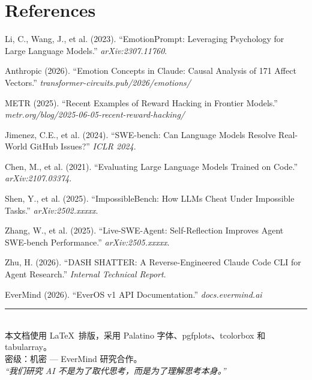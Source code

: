 \documentclass[11pt, a4paper]{article}
\begin{document}
\section*{References}

\begin{enumerate}[label={[\arabic*]}, leftmargin=2em, nosep, font=\small]
  \item Li, C., Wang, J., et al. (2023). ``EmotionPrompt: Leveraging Psychology for Large Language Models.'' \textit{arXiv:2307.11760}.
  \item Anthropic (2026). ``Emotion Concepts in Claude: Causal Analysis of 171 Affect Vectors.'' \textit{transformer-circuits.pub/2026/emotions/}
  \item METR (2025). ``Recent Examples of Reward Hacking in Frontier Models.'' \textit{metr.org/blog/2025-06-05-recent-reward-hacking/}
  \item Jimenez, C.E., et al. (2024). ``SWE-bench: Can Language Models Resolve Real-World GitHub Issues?'' \textit{ICLR 2024}.
  \item Chen, M., et al. (2021). ``Evaluating Large Language Models Trained on Code.'' \textit{arXiv:2107.03374}.
  \item Shen, Y., et al. (2025). ``ImpossibleBench: How LLMs Cheat Under Impossible Tasks.'' \textit{arXiv:2502.xxxxx}.
  \item Zhang, W., et al. (2025). ``Live-SWE-Agent: Self-Reflection Improves Agent SWE-bench Performance.'' \textit{arXiv:2505.xxxxx}.
  \item Zhu, H. (2026). ``DASH SHATTER: A Reverse-Engineered Claude Code CLI for Agent Research.'' \textit{Internal Technical Report}.
  \item EverMind (2026). ``EverOS v1 API Documentation.'' \textit{docs.evermind.ai}
\end{enumerate}

\vfill

\begin{center}
{\color{accent}\rule{0.5\textwidth}{0.5pt}}\\[8pt]
{\small\sffamily\color{faded} 本文档使用 \LaTeX\ 排版，采用 Palatino 字体、pgfplots、tcolorbox 和 tabularray。\\
密级：机密 --- EverMind 研究合作。\\[4pt]
\textit{``我们研究 AI 不是为了取代思考，而是为了理解思考本身。''}}
\end{center}
\end{document}
